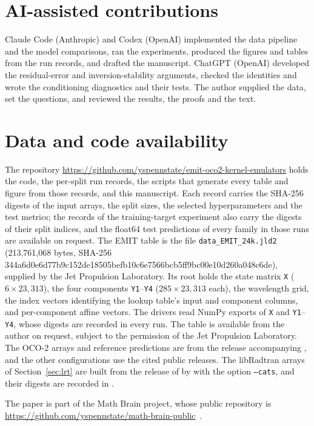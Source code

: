 \documentclass[11pt]{article}
\newcommand{\1}{\mathbf{1}}
\begin{document}
\section*{AI-assisted contributions}

Claude Code (Anthropic) and Codex (OpenAI) implemented the data pipeline and the model
comparisons, ran the experiments, produced the figures and tables from the run records, and
drafted the manuscript. ChatGPT (OpenAI) developed the residual-error and inversion-stability
arguments, checked the identities and wrote the conditioning diagnostics and their tests. The
author supplied the data, set the questions, and reviewed the results, the proofs and the text.

\section*{Data and code availability}

The repository
\url{https://github.com/yspennstate/emit-oco2-kernel-emulators}
holds the code, the per-split run records, the scripts that generate every table and figure from
those records, and this manuscript. Each record carries the
SHA-256 digests of the input arrays, the split sizes, the selected hyperparameters and the test
metrics; the records of the training-target experiment also carry the digests of their split
indices, and the float64 test predictions of every family in those runs are available on
request. The EMIT table is the file
\texttt{data\_EMIT\_24k.jld2} (213{,}761{,}068 bytes, SHA-256
{\small\ttfamily 344a6d0e6d77b9c152de18505befb10c6\allowbreak e7566bcb5ff9bc00e10d260a048c6de}),
supplied by the Jet Propulsion Laboratory. Its root holds the state matrix \texttt{X}
($6\times23{,}313$), the four components \texttt{Y1}--\texttt{Y4} ($285\times23{,}313$ each), the
wavelength grid, the index vectors identifying the lookup table's input and component columns, and
per-component affine vectors. The drivers read NumPy exports of \texttt{X} and
\texttt{Y1}--\texttt{Y4}, whose digests are recorded in every run. The table is available from the
author on request, subject to the permission of the Jet Propulsion Laboratory. The OCO-2 arrays and
reference predictions are from the release accompanying \cite{lamminpaa}, and the other
configurations use the cited public releases. The libRadtran arrays of Section~\ref{sec:lrt} are
built from the release of \cite{pkan} by  with the option
\texttt{--cats}, and their digests are recorded in .

The paper is part of the Math Brain project, whose public repository is \url{https://github.com/yspennstate/math-brain-public}~\cite{MathBrainRepo}.


\end{document}
